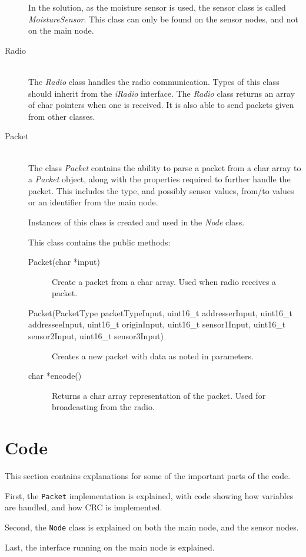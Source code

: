 \begin{description}
In the solution, as the moisture sensor is used, the sensor class is called \textit{MoistureSensor}. This class can only be found on the sensor nodes, and not on the main node.


\item[Radio] \hfill \\
The \textit{Radio} class handles the radio communication. Types of this class should inherit from the \textit{iRadio} interface. The \textit{Radio} class returns an array of char pointers when one is received. It is also able to send packets given from other classes.

\item[Packet] \hfill \\
The class \textit{Packet} contains the ability to parse a packet from a char array to a \textit{Packet} object, along with the properties required to further handle the packet. This includes the type, and possibly sensor values, from/to values or an identifier from the main node.

Instances of this class is created and used in the \textit{Node} class.

This class contains the public methods:
\begin{description}
\item[Packet(char *input)] Create a packet from a char array. Used when radio receives a packet.
\item[Packet(PacketType packetTypeInput, uint16\_t addresserInput, uint16\_t addresseeInput, uint16\_t originInput, uint16\_t sensor1Input, uint16\_t sensor2Input, uint16\_t sensor3Input)] Creates a new packet with data as noted in parameters.
\item[char *encode()] Returns a char array representation of the packet. Used for broadcasting from the radio.
\end{description}

\end{description}


\section{Code}
This section contains explanations for some of the important parts of the code.

First, the \texttt{Packet} implementation is explained, with code showing how variables are handled, and how CRC is implemented.

Second, the \texttt{Node} class is explained on both the main node, and the sensor nodes.

Last, the interface running on the main node is explained.



